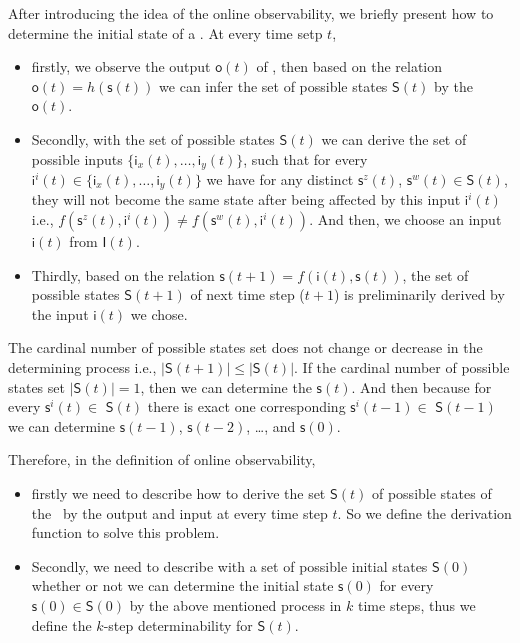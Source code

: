 After introducing the idea of the online observability, we briefly present how to determine the initial state of a \BCN. At every time setp $t$, 
\begin{itemize}
\item firstly, we observe the output $\mathsf{o}(t)$ of \BCN, then based on the relation $\mathsf{o}(t)=h(\mathsf{s}(t))$ we can infer the set of possible states $\mathsf{S}(t)$ by the $\mathsf{o}(t)$.
\item Secondly, with the set of possible states $\mathsf{S}(t)$ we can derive the set of possible inputs $\{\mathsf{i}_x(t),\ldots,\mathsf{i}_y(t)\}$, such that for every $\mathsf{i}^{i}(t)\in \{\mathsf{i}_x(t),\ldots,\mathsf{i}_y(t)\}$ we have  for any distinct $\mathsf{s}^{z}(t)$, $\mathsf{s}^{w}(t) \in \mathsf{S}(t)$, they will not become the same state after being affected by this input $\mathsf{i}^{i}(t)$ i.e., $f(\mathsf{s}^{z}(t), \mathsf{i}^{i}(t))\neq f(\mathsf{s}^{w}(t),\mathsf{i}^{i}(t))$.  And then, we choose an input $\mathsf{i}(t)$ from $\mathsf{I}(t)$.
\item Thirdly, based on the relation $\mathsf{s}(t+1)= f({\mathsf{i}(t)},{\mathsf{s}(t)})$, the set of possible states $\mathsf{S}(t+1)$ of next time step ($t+1$) is preliminarily derived by the input $\mathsf{i}(t)$ we chose. 
\end{itemize} 
 The cardinal number of possible states set does not change or decrease in the determining process i.e., $|\mathsf{S}(t+1)|\le|\mathsf{S}(t)|$. %
 If the cardinal number of possible states set $|\mathsf{S}(t)|=1$, then we can determine the $\mathsf{s}(t)$. And then because for every $\mathsf{s}^{i}(t)\in $ $\mathsf{S}(t)$ there is exact one corresponding $\mathsf{s}^{i}(t-1)\in $ $\mathsf{S}(t-1)$ we can determine $\mathsf{s}(t-1)$, $\mathsf{s}(t-2)$, \ldots, and $\mathsf{s}(0)$.

Therefore, in the definition of online observability, 
\begin{itemize}
\item firstly we need to describe how to derive the set $\mathsf{S}(t)$ of possible states of the \BCN\ by the output and input at every time step $t$. So we define the derivation function to solve this problem.
\item  Secondly, we need to describe with a set of possible initial states $\mathsf{S}(0)$ whether or not we can determine the initial state $\mathsf{s}(0)$ for every $\mathsf{s}(0) \in \mathsf{S}(0)$ by the above mentioned process in $k$ time steps, thus we define the $k$-step determinability for $\mathsf{S}(t)$. 
\end{itemize} 

